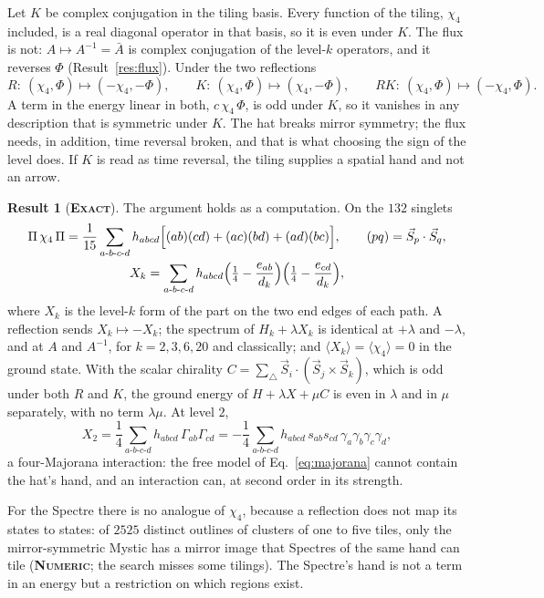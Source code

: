 \documentclass[11pt]{article}
\newcommand{\exact}{\textbf{\textsc{Exact}}}
\newcommand{\numeric}{\textbf{\textsc{Numeric}}}
\theoremstyle{definition}
\newtheorem{result}{Result}
\begin{document}
Let $K$ be complex conjugation in the tiling basis. Every function of the tiling, $\chi_4$ included, is a real diagonal operator in that basis, so it is even under $K$. The flux is not: $A\mapsto A^{-1}=\bar A$ is complex conjugation of the level-$k$ operators, and it reverses $\Phi$ (Result~\ref{res:flux}). Under the two reflections
\begin{equation}\label{eq:hands}
R:\ (\chi_4,\Phi)\mapsto(-\chi_4,-\Phi),\qquad K:\ (\chi_4,\Phi)\mapsto(\chi_4,-\Phi),\qquad RK:\ (\chi_4,\Phi)\mapsto(-\chi_4,\Phi).
\end{equation}
A term in the energy linear in both, $c\,\chi_4\,\Phi$, is odd under $K$, so it vanishes in any description that is symmetric under $K$. The hat breaks mirror symmetry; the flux needs, in addition, time reversal broken, and that is what choosing the sign of the level does. If $K$ is read as time reversal, the tiling supplies a spatial hand and not an arrow.
\begin{result}[\exact]\label{res:chi4op}
The argument holds as a computation. On the $132$ singlets
\begin{equation}\label{eq:chi4op}
\begin{gathered}
\Pi\,\chi_4\,\Pi=\frac1{15}\sum_{a\text{-}b\text{-}c\text{-}d}h_{abcd}\Bigl[(ab)(cd)+(ac)(bd)+(ad)(bc)\Bigr],\qquad (pq)=\vec S_p\cdot\vec S_q,\\
X_k=\sum_{a\text{-}b\text{-}c\text{-}d}h_{abcd}\Bigl(\tfrac14-\frac{e_{ab}}{d_k}\Bigr)\Bigl(\tfrac14-\frac{e_{cd}}{d_k}\Bigr),
\end{gathered}
\end{equation}
where $X_k$ is the level-$k$ form of the part on the two end edges of each path. A reflection sends $X_k\mapsto-X_k$; the spectrum of $H_k+\lambda X_k$ is identical at $+\lambda$ and $-\lambda$, and at $A$ and $A^{-1}$, for $k=2,3,6,20$ and classically; and $\langle X_k\rangle=\langle\chi_4\rangle=0$ in the ground state. With the scalar chirality $C=\sum_{\triangle}\vec S_i\cdot(\vec S_j\times\vec S_k)$, which is odd under both $R$ and $K$, the ground energy of $H+\lambda X+\mu C$ is even in $\lambda$ and in $\mu$ separately, with no term $\lambda\mu$. At level $2$,
\begin{equation}\label{eq:x2}
X_2=\frac14\sum_{a\text{-}b\text{-}c\text{-}d}h_{abcd}\,\Gamma_{ab}\Gamma_{cd}=-\frac14\sum_{a\text{-}b\text{-}c\text{-}d}h_{abcd}\,s_{ab}s_{cd}\,\gamma_a\gamma_b\gamma_c\gamma_d ,
\end{equation}
a four-Majorana interaction: the free model of Eq.~\eqref{eq:majorana} cannot contain the hat's hand, and an interaction can, at second order in its strength.
\end{result}
For the Spectre there is no analogue of $\chi_4$, because a reflection does not map its states to states: of $2525$ distinct outlines of clusters of one to five tiles, only the mirror-symmetric Mystic has a mirror image that Spectres of the same hand can tile (\numeric; the search misses some tilings). The Spectre's hand is not a term in an energy but a restriction on which regions exist.
\end{document}
